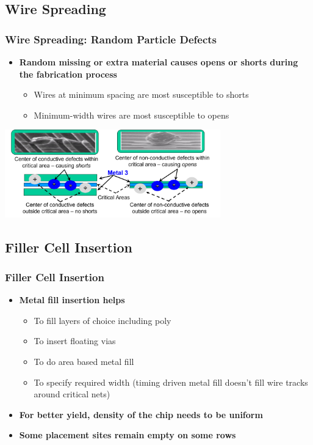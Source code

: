 \documentclass[compress]{beamer}
\begin{document}
\subsection[Wire]{Wire Spreading}
\begin{frame}
	\frametitle{Wire Spreading: Random Particle Defects }
	\begin{itemize}
		\item \textbf{Random missing or extra material causes opens or
			shorts during the fabrication process}
		\begin{itemize}
			\item Wires at minimum spacing are most susceptible to shorts
			\item Minimum-width wires are most susceptible to opens
		\end{itemize}
	\end{itemize}
\begin{center}
	\includegraphics[width=0.7\textwidth]{wire}
\end{center}
\end{frame}

\subsection[Filler]{Filler Cell Insertion}
\begin{frame}
	\frametitle{Filler Cell Insertion}
	\begin{itemize}
		\item \textbf{Metal fill insertion helps }
		\begin{itemize}
			\item To fill layers of choice including poly
			\item To insert floating vias 
			\item To do area based metal fill 
			\item To specify required width (timing driven metal fill doesn’t fill wire tracks around critical nets)
			
		\end{itemize}
		\item \textbf{For better yield, density of the chip needs to be uniform}
		\item \textbf{Some placement sites remain empty on some rows}
		
	\end{itemize}
\end{frame}
\end{document}
